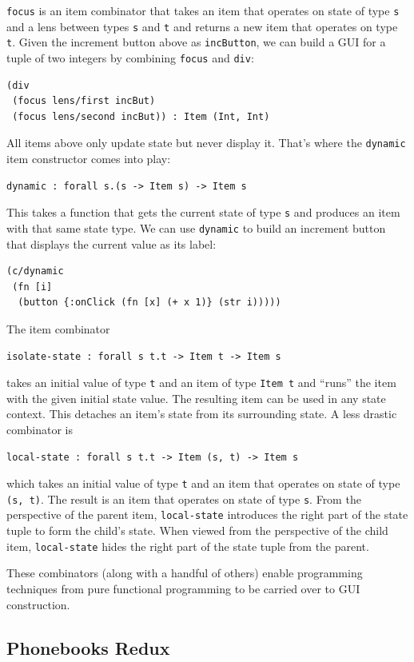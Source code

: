 \documentclass[sigplan,review,screen]{acmart}
\begin{document}
\texttt{focus} is an item combinator that takes an
item that operates on state of type \texttt{s} and a lens between
types \texttt{s} and \texttt{t} and returns a new item that operates
on type \texttt{t}.  Given the increment button above as
\texttt{incButton}, we can build a GUI for a tuple of two integers by
combining \texttt{focus} and \texttt{div}:
%
\begin{verbatim}
(div
 (focus lens/first incBut)
 (focus lens/second incBut)) : Item (Int, Int)
\end{verbatim}
%
All items above only update
state but never display it. That's where the \texttt{dynamic} item
constructor comes into play:
%
\begin{verbatim}
dynamic : forall s.(s -> Item s) -> Item s
\end{verbatim}
%
This takes a
function that gets the current state of type \texttt{s} 
and produces an item with that same state type. We can use
\texttt{dynamic} to build an increment button that displays the
current value as its label:
%
\begin{verbatim}
(c/dynamic
 (fn [i]
  (button {:onClick (fn [x] (+ x 1)} (str i)))))
\end{verbatim}
%
The item combinator
%
\begin{verbatim}
isolate-state : forall s t.t -> Item t -> Item s
\end{verbatim}
%
takes an initial value of type \texttt{t} and an item of
type \texttt{Item t} and ``runs'' the item with the given initial
state value. The resulting item can be used in any state context. This
detaches an item's state from its surrounding
state.
A less drastic combinator is
%
\begin{verbatim}
local-state : forall s t.t -> Item (s, t) -> Item s
\end{verbatim}
%
which takes an initial value of type \texttt{t} and an item that
operates on state of type \texttt{(s, t)}. The result is an item that
operates on state of type \texttt{s}. From the perspective
of the parent item, \texttt{local-state} introduces the right part of
the state tuple to form the child's state. When viewed from the
perspective of the child item, \texttt{local-state} hides the right
part of the state tuple from the parent.

These combinators (along with a handful of others) enable programming
techniques from pure functional programming to be carried over to GUI
construction.

\subsection{Phonebooks Redux}
\end{document}
